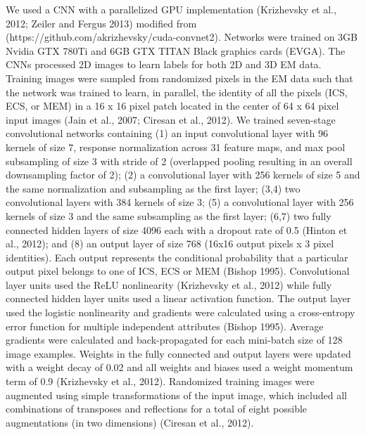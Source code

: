 \documentclass{article}
\begin{document}
We used a CNN with a parallelized GPU implementation (Krizhevsky et al., 2012; Zeiler and Fergus 2013) modified from (https://github.com/akrizhevsky/cuda-convnet2). Networks were trained on 3GB Nvidia GTX 780Ti and 6GB GTX TITAN Black graphics cards (EVGA). The CNNs processed 2D images to learn labels for both 2D and 3D EM data. Training images were sampled from randomized pixels in the EM data such that the network was trained to learn, in parallel, the identity of all the pixels (ICS, ECS, or MEM) in a 16 x 16 pixel patch located in the center of 64 x 64 pixel input images (Jain et al., 2007; Ciresan et al., 2012). We trained seven-stage convolutional networks containing (1) an input convolutional layer with 96 kernels of size 7, response normalization across 31 feature maps, and max pool subsampling of size 3 with stride of 2 (overlapped pooling resulting in an overall downsampling factor of 2); (2) a convolutional layer with 256 kernels of size 5 and the same normalization and subsampling as the first layer; (3,4) two convolutional layers with 384 kernels of size 3; (5) a convolutional layer with 256 kernels of size 3 and the same subsampling as the first layer; (6,7) two fully connected hidden layers of size 4096 each with a dropout rate of 0.5 (Hinton et al., 2012); and (8) an output layer of size 768 (16x16 output pixels x 3 pixel identities). Each output represents the conditional probability that a particular output pixel belongs to one of ICS, ECS or MEM (Bishop 1995). Convolutional layer units used the ReLU nonlinearity (Krizhevsky et al., 2012) while fully connected hidden layer units used a linear activation function. The output layer used the logistic nonlinearity and gradients were calculated using a cross-entropy error function for multiple independent attributes (Bishop 1995). Average gradients were calculated and back-propagated for each mini-batch size of 128 image examples. Weights in the fully connected and output layers were updated with a weight decay of 0.02 and all weights and biases used a weight momentum term of 0.9 (Krizhevsky et al., 2012). Randomized training images were augmented using simple transformations of the input image, which included all combinations of transposes and reflections for a total of eight possible augmentations (in two dimensions) (Ciresan et al., 2012).
\end{document}
